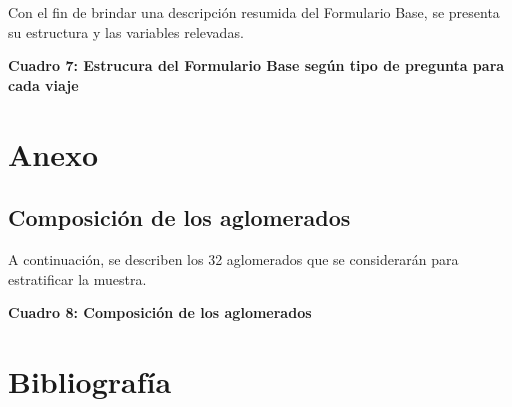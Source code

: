 \documentclass[
  openany]{book}
\begin{document}
Con el fin de brindar una descripción resumida del Formulario Base, se presenta su estructura y las variables relevadas.

\textbf{Cuadro 7: Estrucura del Formulario Base según tipo de pregunta para cada viaje}

\hypertarget{anexo}{%
\chapter{\texorpdfstring{\textbf{Anexo}}{Anexo}}\label{anexo}}

\hypertarget{composiciuxf3n-de-los-aglomerados}{%
\section{Composición de los aglomerados}\label{composiciuxf3n-de-los-aglomerados}}

A continuación, se describen los 32 aglomerados que se considerarán para estratificar la muestra.

\textbf{Cuadro 8: Composición de los aglomerados}

\hypertarget{bibliografuxeda}{%
\chapter{\texorpdfstring{\textbf{Bibliografía}}{Bibliografía}}\label{bibliografuxeda}}
\end{document}

